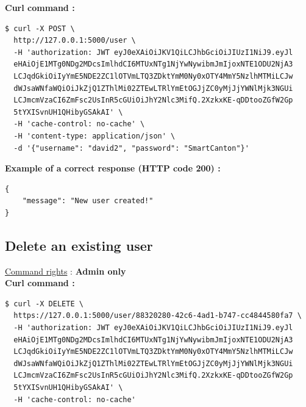 \textbf{Curl command :}

\begin{tcolorbox}[top=-3mm, bottom=-3mm, left=0mm, right=0mm, enhanced, breakable, colback=LightGray, colframe=DarkGray, colbacktitle=DarkGray]
\begin{verbatim}
$ curl -X POST \
  http://127.0.0.1:5000/user \
  -H 'authorization: JWT eyJ0eXAiOiJKV1QiLCJhbGciOiJIUzI1NiJ9.eyJl
  eHAiOjE1MTg0NDg2MDcsImlhdCI6MTUxNTg1NjYwNywibmJmIjoxNTE1ODU2NjA3
  LCJqdGkiOiIyYmE5NDE2ZC1lOTVmLTQ3ZDktYmM0Ny0xOTY4MmY5NzlhMTMiLCJw
  dWJsaWNfaWQiOiJkZjQ1ZThlMi02ZTEwLTRlYmEtOGJjZC0yMjJjYWNlMjk3NGUi
  LCJmcmVzaCI6ZmFsc2UsInR5cGUiOiJhY2Nlc3MifQ.2XzkxKE-qDDtooZGfW2Gp
  5tYXISvnUH1QHibyGSAkAI' \
  -H 'cache-control: no-cache' \
  -H 'content-type: application/json' \
  -d '{"username": "david2", "password": "SmartCanton"}'
\end{verbatim}
\end{tcolorbox}

\newpage
\textbf{Example of a correct response (HTTP code 200) : }

\begin{tcolorbox}[top=-3mm, bottom=-3mm, left=0mm, right=0mm, enhanced, breakable, colback=LightGray, colframe=DarkGray, colbacktitle=DarkGray]
\begin{verbatim}
{
    "message": "New user created!"
}
\end{verbatim}
\end{tcolorbox}


\subsection{Delete an existing user}
\underline{Command rights} : \textbf{Admin only}\\

\textbf{Curl command :}

\begin{tcolorbox}[top=-3mm, bottom=-3mm, left=0mm, right=0mm, enhanced, breakable, colback=LightGray, colframe=DarkGray, colbacktitle=DarkGray]
\begin{verbatim}
$ curl -X DELETE \
  https://127.0.0.1:5000/user/88320280-42c6-4ad1-b747-cc4844580fa7 \
  -H 'authorization: JWT eyJ0eXAiOiJKV1QiLCJhbGciOiJIUzI1NiJ9.eyJl
  eHAiOjE1MTg0NDg2MDcsImlhdCI6MTUxNTg1NjYwNywibmJmIjoxNTE1ODU2NjA3
  LCJqdGkiOiIyYmE5NDE2ZC1lOTVmLTQ3ZDktYmM0Ny0xOTY4MmY5NzlhMTMiLCJw
  dWJsaWNfaWQiOiJkZjQ1ZThlMi02ZTEwLTRlYmEtOGJjZC0yMjJjYWNlMjk3NGUi
  LCJmcmVzaCI6ZmFsc2UsInR5cGUiOiJhY2Nlc3MifQ.2XzkxKE-qDDtooZGfW2Gp
  5tYXISvnUH1QHibyGSAkAI' \
  -H 'cache-control: no-cache' 
\end{verbatim}
\end{tcolorbox}


